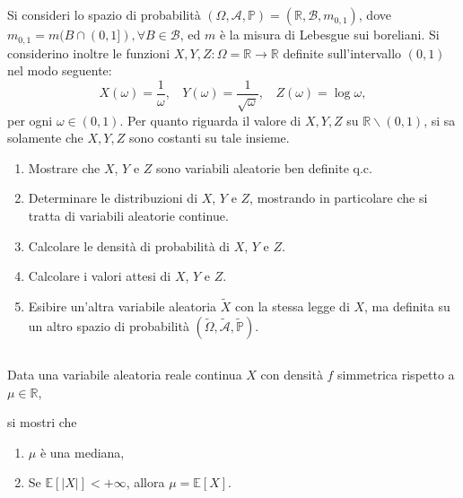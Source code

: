 

\section{}
\subsection{}

Si consideri lo spazio di probabilità $( \Omega ,\mathcal{A} ,\mathbb{P}) =(\mathbb{R} ,\mathcal{B} ,m_{0,1})$, dove $m_{0,1} =m( B\cap ( 0,1]) ,\forall B\in \mathcal{B}$, ed $m$ è la misura di Lebesgue sui boreliani. Si considerino inoltre le funzioni $X,Y,Z:\Omega =\mathbb{R}\rightarrow \mathbb{R}$ definite sull'intervallo $( 0,1)$ nel modo seguente:
\begin{equation*}
X( \omega ) =\frac{1}{\omega } ,\ \ \ \ Y( \omega ) =\frac{1}{\sqrt{\omega }} ,\ \ \ \ Z( \omega ) =\log \omega ,
\end{equation*}
per ogni $\omega \in ( 0,1)$. Per quanto riguarda il valore di $X,Y,Z$ su $\mathbb{R} \smallsetminus ( 0,1)$, si sa solamente che $X,Y,Z$ sono costanti su tale insieme.
\begin{enumerate}
\item Mostrare che $X$, $Y$ e $Z$ sono variabili aleatorie ben definite q.c.
\item Determinare le distribuzioni di $X$, $Y$ e $Z$, mostrando in particolare che si tratta di variabili aleatorie continue.
\item Calcolare le densità di probabilità di $X$, $Y$ e $Z$.
\item Calcolare i valori attesi di $X$, $Y$ e $Z$.
\item Esibire un'altra variabile aleatoria $\tilde{X}$ con la stessa legge di $X$, ma definita su un altro spazio di probabilità $\left(\tilde{\Omega } ,\tilde{\mathcal{A}} ,\tilde{\mathbb{P}}\right)$.
\end{enumerate}
\subsection{}

Data una variabile aleatoria reale continua $X$ con densità $f$ simmetrica rispetto a $\mu \in \mathbb{R}$,

si mostri che
\begin{enumerate}
\item $\mu $ è una mediana,
\item Se $\mathbb{E}[| X| ] < +\infty $, allora $\mu =\mathbb{E}[ X]$.
\end{enumerate}
